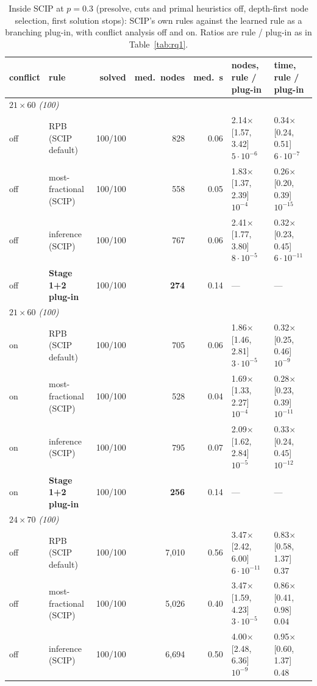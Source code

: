 \begin{table}[t]
\centering
\caption{Inside SCIP at $p=0.3$ (presolve, cuts and primal heuristics off, depth-first node selection, first solution stops): SCIP's own rules against the learned rule as a branching plug-in, with conflict analysis off and on. Ratios are rule / plug-in as in Table~\ref{tab:rq1}.}
\label{tab:scip}
\footnotesize
\begin{tabular}{llrrrll}
\toprule
conflict & rule & solved & med.\ nodes & med.\ s & nodes, rule / plug-in & time, rule / plug-in \\
\midrule
\multicolumn{7}{l}{\emph{$21\times60$ (100)}} \\
off & RPB (SCIP default) & 100/100 & 828 & 0.06 & 2.14$\times$ [1.57, 3.42] $5\cdot10^{-6}$ & 0.34$\times$ [0.24, 0.51] $6\cdot10^{-7}$ \\
off & most-fractional (SCIP) & 100/100 & 558 & 0.05 & 1.83$\times$ [1.37, 2.39] $10^{-4}$ & 0.26$\times$ [0.20, 0.39] $10^{-15}$ \\
off & inference (SCIP) & 100/100 & 767 & 0.06 & 2.41$\times$ [1.77, 3.80] $8\cdot10^{-5}$ & 0.32$\times$ [0.23, 0.45] $6\cdot10^{-11}$ \\
off & \textbf{Stage 1+2 plug-in} & 100/100 & \textbf{274} & 0.14 & --- & --- \\
\midrule
\multicolumn{7}{l}{\emph{$21\times60$ (100)}} \\
on & RPB (SCIP default) & 100/100 & 705 & 0.06 & 1.86$\times$ [1.46, 2.81] $3\cdot10^{-5}$ & 0.32$\times$ [0.25, 0.46] $10^{-9}$ \\
on & most-fractional (SCIP) & 100/100 & 528 & 0.04 & 1.69$\times$ [1.33, 2.27] $10^{-4}$ & 0.28$\times$ [0.23, 0.39] $10^{-11}$ \\
on & inference (SCIP) & 100/100 & 795 & 0.07 & 2.09$\times$ [1.62, 2.84] $10^{-5}$ & 0.33$\times$ [0.24, 0.45] $10^{-12}$ \\
on & \textbf{Stage 1+2 plug-in} & 100/100 & \textbf{256} & 0.14 & --- & --- \\
\midrule
\multicolumn{7}{l}{\emph{$24\times70$ (100)}} \\
off & RPB (SCIP default) & 100/100 & 7,010 & 0.56 & 3.47$\times$ [2.42, 6.00] $6\cdot10^{-11}$ & 0.83$\times$ [0.58, 1.37] $0.37$ \\
off & most-fractional (SCIP) & 100/100 & 5,026 & 0.40 & 3.47$\times$ [1.59, 4.23] $3\cdot10^{-5}$ & 0.86$\times$ [0.41, 0.98] $0.04$ \\
off & inference (SCIP) & 100/100 & 6,694 & 0.50 & 4.00$\times$ [2.48, 6.36] $10^{-9}$ & 0.95$\times$ [0.60, 1.37] $0.48$ \\

\end{tabular}
\end{table}
